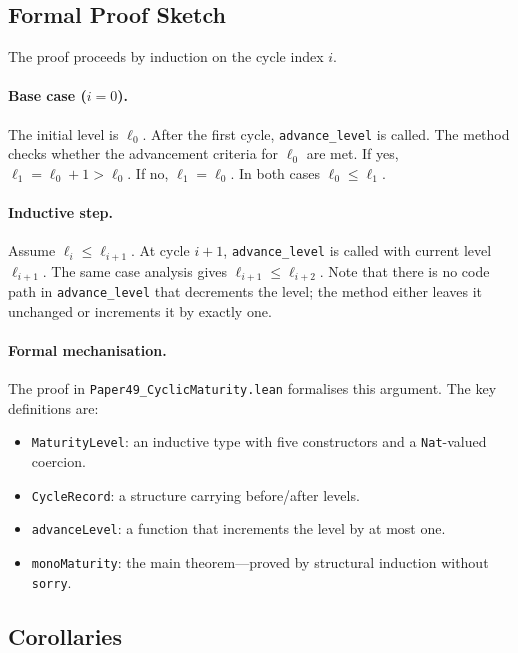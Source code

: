 \documentclass[11pt]{article}
\begin{document}
\subsection{Formal Proof Sketch}

The proof proceeds by induction on the cycle index $i$.

\paragraph{Base case ($i = 0$).}
The initial level is $\ell_0$.  After the first cycle, \texttt{advance\_level}
is called.  The method checks whether the advancement criteria for
$\ell_0$ are met.  If yes, $\ell_1 = \ell_0 + 1 > \ell_0$.  If no,
$\ell_1 = \ell_0$.  In both cases $\ell_0 \leq \ell_1$.

\paragraph{Inductive step.}
Assume $\ell_i \leq \ell_{i+1}$.  At cycle $i+1$, \texttt{advance\_level}
is called with current level $\ell_{i+1}$.  The same case analysis gives
$\ell_{i+1} \leq \ell_{i+2}$.  Note that there is no code path in
\texttt{advance\_level} that decrements the level; the method either leaves
it unchanged or increments it by exactly one.

\paragraph{Formal mechanisation.}
The \LEAN{} proof in \texttt{Paper49\_CyclicMaturity.lean} formalises this
argument.  The key definitions are:

\begin{itemize}
  \item \texttt{MaturityLevel}: an inductive type with five constructors
    and a \texttt{Nat}-valued coercion.
  \item \texttt{CycleRecord}: a structure carrying before/after levels.
  \item \texttt{advanceLevel}: a function that increments the level by
    at most one.
  \item \texttt{monoMaturity}: the main theorem—proved by structural
    induction without \texttt{sorry}.
\end{itemize}

\subsection{Corollaries}
\end{document}

